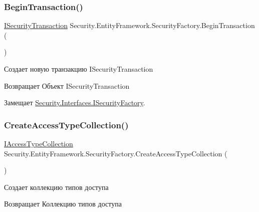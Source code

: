 \subsubsection{\texorpdfstring{Begin\+Transaction()}{BeginTransaction()}}
{\footnotesize\ttfamily \hyperlink{interface_security_1_1_interfaces_1_1_i_security_transaction}{I\+Security\+Transaction} Security.\+Entity\+Framework.\+Security\+Factory.\+Begin\+Transaction (\begin{DoxyParamCaption}{ }\end{DoxyParamCaption})}



Создает новую транзакцию I\+Security\+Transaction 

\begin{DoxyReturn}{Возвращает}
Объект I\+Security\+Transaction
\end{DoxyReturn}


Замещает \hyperlink{interface_security_1_1_interfaces_1_1_i_security_factory_a7c6e1914da204e43cc140647f4c2b384}{Security.\+Interfaces.\+I\+Security\+Factory}.

\mbox{\label{class_security_1_1_entity_framework_1_1_security_factory_aa952c6d768a5219de923e06f2c7a6def}} 
\subsubsection{\texorpdfstring{Create\+Access\+Type\+Collection()}{CreateAccessTypeCollection()}}
{\footnotesize\ttfamily \hyperlink{interface_security_1_1_interfaces_1_1_collections_1_1_i_access_type_collection}{I\+Access\+Type\+Collection} Security.\+Entity\+Framework.\+Security\+Factory.\+Create\+Access\+Type\+Collection (\begin{DoxyParamCaption}{ }\end{DoxyParamCaption})}



Создает коллекцию типов доступа 

\begin{DoxyReturn}{Возвращает}
Коллекцию типов доступа
\end{DoxyReturn}


